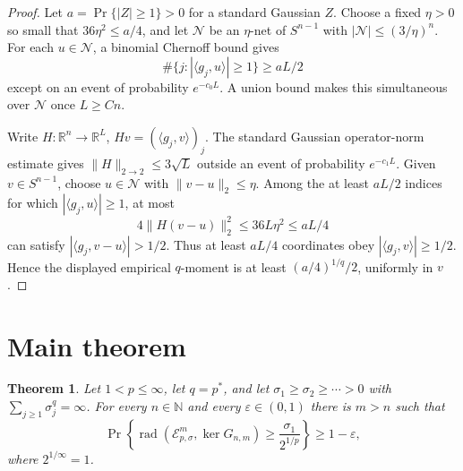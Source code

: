 \documentclass[11pt]{article}
\newtheorem{theorem}{Theorem}
\newcommand{\R}{\mathbb R}
\newcommand{\E}{\mathcal E}
\newcommand{\rad}{\operatorname{rad}}
\newcommand{\ip}[2]{\langle #1,#2\rangle}
\begin{document}
\begin{proof}
Let $a=\Pr\{|Z|\geq1\}>0$ for a standard Gaussian $Z$.  Choose a fixed $\eta>0$ so small that $36\eta^2\leq a/4$, and let $\mathcal N$ be an $\eta$-net of $S^{n-1}$ with $|\mathcal N|\leq(3/\eta)^n$.  For each $u\in\mathcal N$, a binomial Chernoff bound gives
\[
 \#\{j:|\ip{g_j}{u}|\geq1\}\geq aL/2
\]
except on an event of probability $e^{-c_0L}$.  A union bound makes this simultaneous over $\mathcal N$ once $L\geq Cn$.

Write $H:\R^n\to\R^L$, $Hv=(\ip{g_j}{v})_j$.  The standard Gaussian operator-norm estimate gives $\|H\|_{2\to2}\leq3\sqrt L$ outside an event of probability $e^{-c_1L}$.  Given $v\in S^{n-1}$, choose $u\in\mathcal N$ with $\|v-u\|_2\leq\eta$.  Among the at least $aL/2$ indices for which $|\ip{g_j}{u}|\geq1$, at most
\[
 4\|H(v-u)\|_2^2\leq36L\eta^2\leq aL/4
\]
can satisfy $|\ip{g_j}{v-u}|>1/2$.  Thus at least $aL/4$ coordinates obey $|\ip{g_j}{v}|\geq1/2$.  Hence the displayed empirical $q$-moment is at least $(a/4)^{1/q}/2$, uniformly in $v$.
\end{proof}

\section*{Main theorem}

\begin{theorem}\label{thm:main}
Let $1<p\leq\infty$, let $q=p^*$, and let
$\sigma_1\geq\sigma_2\geq\cdots>0$ with
$\sum_{j\geq1}\sigma_j^q=\infty$.  For every $n\in\mathbb N$ and every $\varepsilon\in(0,1)$ there is $m>n$ such that
\[
 \Pr\left\{\rad(\E_{p,\sigma}^m,\ker G_{n,m})
 \geq \frac{\sigma_1}{2^{1/p}}\right\}\geq1-\varepsilon,
\]
where $2^{1/\infty}=1$.
\end{theorem}
\end{document}
